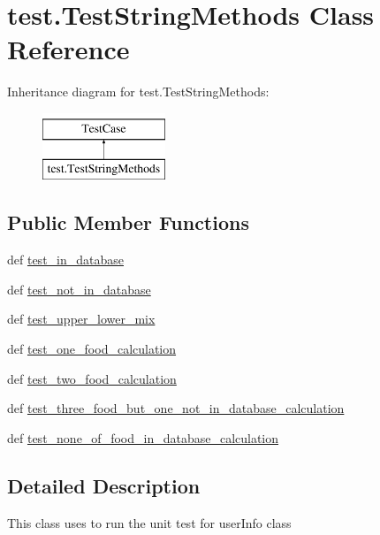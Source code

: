 \hypertarget{classtest_1_1TestStringMethods}{\section{test.\-Test\-String\-Methods Class Reference}
\label{classtest_1_1TestStringMethods}
}
Inheritance diagram for test.\-Test\-String\-Methods\-:\begin{figure}[H]
\begin{center}
\leavevmode
\includegraphics[height=2.000000cm]{classtest_1_1TestStringMethods}
\end{center}
\end{figure}
\subsection*{Public Member Functions}
\begin{DoxyCompactItemize}
\item 
def \hyperlink{classtest_1_1TestStringMethods_a1832baef4f040234656ffd378c2e6b81}{test\-\_\-in\-\_\-database}
\item 
def \hyperlink{classtest_1_1TestStringMethods_a81a9eaa19a51f16dbec286ac7731cb16}{test\-\_\-not\-\_\-in\-\_\-database}
\item 
def \hyperlink{classtest_1_1TestStringMethods_aa08b7eb60e48fd3579e3143bf1533c8a}{test\-\_\-upper\-\_\-lower\-\_\-mix}
\item 
def \hyperlink{classtest_1_1TestStringMethods_a840d5f836cbf6c2ff6921ad4b0b8fd86}{test\-\_\-one\-\_\-food\-\_\-calculation}
\item 
def \hyperlink{classtest_1_1TestStringMethods_a2f5e91a33f68511a76ae49d9797aa586}{test\-\_\-two\-\_\-food\-\_\-calculation}
\item 
def \hyperlink{classtest_1_1TestStringMethods_ad42efc3a8a28a05af1b62c49f766a6a2}{test\-\_\-three\-\_\-food\-\_\-but\-\_\-one\-\_\-not\-\_\-in\-\_\-database\-\_\-calculation}
\item 
def \hyperlink{classtest_1_1TestStringMethods_ae5e364e2ff8336f88eaeab28944b0715}{test\-\_\-none\-\_\-of\-\_\-food\-\_\-in\-\_\-database\-\_\-calculation}
\end{DoxyCompactItemize}


\subsection{Detailed Description}
\begin{DoxyVerb}This class uses to run the unit test for userInfo class
\end{DoxyVerb}
 

